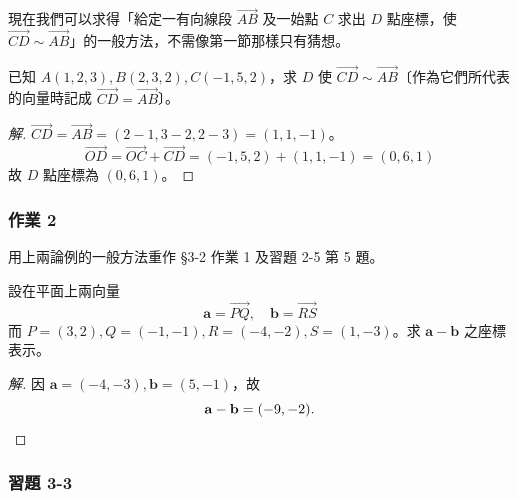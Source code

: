 \begin{example}[論例 4]
現在我們可以求得「給定一有向線段 $\vec{AB}$ 及一始點 $C$ 求出 $D$ 點座標，使 $\vec{CD} \sim \vec{AB}$」的一般方法，不需像第一節那樣只有猜想。

已知 $A(1, 2, 3), B(2, 3, 2), C(-1, 5, 2)$，求 $D$ 使 $\vec{CD} \sim \vec{AB}$〔作為它們所代表的向量時記成 $\vec{CD} = \vec{AB}$〕。
\end{example}

\begin{proof}[解]
$\vec{CD} = \vec{AB} = (2 - 1, 3 - 2, 2 - 3) = (1, 1, -1)$。
\[ \vec{OD} = \vec{OC} + \vec{CD} = (-1, 5, 2) + (1, 1, -1) = (0, 6, 1) \]
故 $D$ 點座標為 $(0, 6, 1)$。\qedhere
\end{proof}

\subsubsection*{作業 2}
用上兩論例的一般方法重作 §3-2 作業 1 及習題 2-5 第 5 題。

\begin{example}
設在平面上兩向量
\[ \mathbf{a} = \vec{PQ}, \quad \mathbf{b} = \vec{RS} \]
而 $P = (3, 2), Q = (-1, -1), R = (-4, -2), S = (1, -3)$。求 $\mathbf{a} - \mathbf{b}$ 之座標表示。
\end{example}

\begin{proof}[解]
因 $\mathbf{a} = (-4, -3), \mathbf{b} = (5, -1)$，故
\[ \mathbf{a} - \mathbf{b} = (-9, -2). \qedhere \]
\end{proof}

\subsubsection*{習題 3-3}

